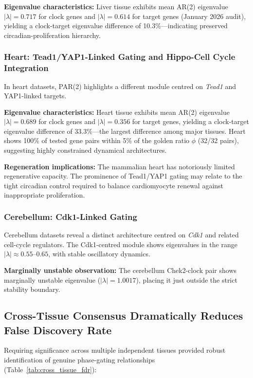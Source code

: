 \documentclass[11pt,a4paper]{article}
\begin{document}
\textbf{Eigenvalue characteristics:} Liver tissue exhibits mean AR(2) eigenvalue $|\lambda| = 0.717$ for clock genes and $|\lambda| = 0.614$ for target genes (January 2026 audit), yielding a clock-target eigenvalue difference of 10.3\%---indicating preserved circadian-proliferation hierarchy.

\subsubsection*{Heart: Tead1/YAP1-Linked Gating and Hippo-Cell Cycle Integration}

In heart datasets, PAR(2) highlights a different module centred on \textit{Tead1} and YAP1-linked targets.

\textbf{Eigenvalue characteristics:} Heart tissue exhibits mean AR(2) eigenvalue $|\lambda| = 0.689$ for clock genes and $|\lambda| = 0.356$ for target genes, yielding a clock-target eigenvalue difference of 33.3\%---the largest difference among major tissues. Heart shows 100\% of tested gene pairs within 5\% of the golden ratio $\phi$ (32/32 pairs), suggesting highly constrained dynamical architectures.

\textbf{Regeneration implications:} The mammalian heart has notoriously limited regenerative capacity. The prominence of Tead1/YAP1 gating may relate to the tight circadian control required to balance cardiomyocyte renewal against inappropriate proliferation.

\subsubsection*{Cerebellum: Cdk1-Linked Gating}

Cerebellum datasets reveal a distinct architecture centred on \textit{Cdk1} and related cell-cycle regulators. The Cdk1-centred module shows eigenvalues in the range $|\lambda| \approx 0.55$--$0.65$, with stable oscillatory dynamics.

\textbf{Marginally unstable observation:} The cerebellum Chek2-clock pair shows marginally unstable eigenvalue ($|\lambda| = 1.0017$), placing it just outside the strict stability boundary.

\subsection{Cross-Tissue Consensus Dramatically Reduces False Discovery Rate}

Requiring significance across multiple independent tissues provided robust identification of genuine phase-gating relationships (Table~\ref{tab:cross_tissue_fdr}):
\end{document}
